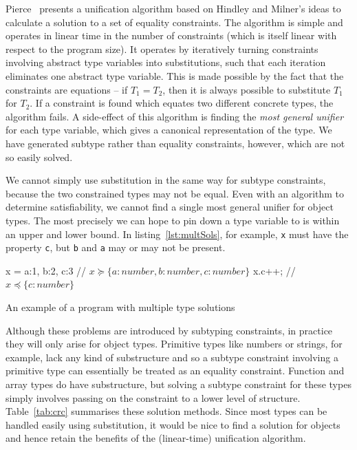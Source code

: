 \documentclass[12pt,a4paper,twoside,openright]{report}
\theoremstyle{definition}
\theoremstyle{dotless}
\newcommand*{\js}{\texttt}
\begin{document}
Pierce~\cite{pierce} presents a unification algorithm based on Hindley and
Milner's ideas to calculate a solution to a set of equality constraints. The
algorithm is simple and operates in linear time in the number of constraints
(which is itself linear with respect to the program size). It operates by
iteratively turning constraints involving abstract type variables into
substitutions, such that each iteration eliminates one abstract type variable.
This is made possible by the fact that the constraints are equations -- if
$T_1=T_2$, then it is always possible to substitute $T_1$ for $T_2$. If a
constraint is found which equates two different concrete types, the algorithm
fails. A side-effect of this algorithm is finding the \textit{most general
  unifier} for each type variable, which gives a canonical
representation of the type.  We have generated subtype rather than equality constraints, however,
which are not so easily solved.

We cannot simply use substitution in the same way for subtype constraints,
because the two constrained types may not be equal. Even with an algorithm to
determine satisfiability, we cannot find a single most general unifier for
object types.  The most precisely we can hope to pin down a type variable to is
within an upper and lower bound.  In listing~\ref{lst:multSols}, for example,
\js{x} must have the property \js{c}, but \js{b} and \js{a} may or may not be
present.  

\begin{listing}[H]
  \begin{jscript}
	x = {a:1, b:2, c:3} // $x \succeq \{a:number, b:number, c:number\}$
	x.c++;              // $x \preceq \{c:number\}$
  \end{jscript}
  \caption{An example of a program with multiple type solutions}\label{lst:multSols}
\end{listing}

Although these problems are introduced by subtyping constraints, in practice
they will only arise for object types. Primitive types like numbers or strings,
for example, lack any kind of substructure and so a subtype constraint
involving a primitive type can essentially be treated as an equality
constraint. Function and array types do have substructure, but solving a
subtype constraint for these types simply involves passing on the constraint to
a lower level of structure. Table~\ref{tab:crc} summarises these solution
methods. Since most types can be handled easily using substitution, it would be
nice to find a solution for objects and hence retain the benefits of the
(linear-time) unification algorithm. 
\end{document}
